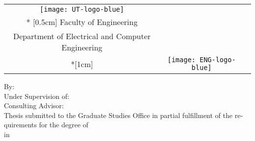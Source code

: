 \cleartoleftpage %
\thispagestyle{empty}
\ignorespaces
\begin{center}
\begin{latin}
	\begin{table}
		\begin{adjustwidth}{1cm}{2.5cm} %
			\begin{tabular}{ccc}
				\texttt{[image: UT-logo-blue]}
				&
				\begin{minipage}{0.55\linewidth}
					\begin{center}
						{\Large
University of Tehran
							\\* [0.5cm]
Faculty of Engineering\\ [0.5cm]
Department of Electrical and Computer Engineering
						}
						\\*[1cm]
					\end{center}
				\end{minipage}
				&
				\texttt{[image: ENG-logo-blue]}\\
			\end{tabular}
		\end{adjustwidth}
	\end{table}
	\null
	\vskip 1cm
	\textbf{\LARGE{\titleEn}}
	\vskip 2cm
	\LARGE{By:}
	\\ [0.4cm] \Large{\authorEn}
	\vskip 1.5cm
	\LARGE{Under Supervision of:}
	\\ [0.4cm] \Large{\supervisorEn}
	\vskip 1.5cm
	\LARGE{Consulting Advisor:}
	\\ [0.4cm] \Large{\advisorEn}
	\vskip 2cm
	{\normalsize Thesis submitted to the Graduate Studies Office
	in partial fulfillment of the requirements for
	the degree of
	\degreeEn
	\\
	in
	\majorEn}
	\vskip 1cm
	\large{\dateEn}
\end{latin}
\end{center}
\clearpage
